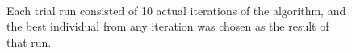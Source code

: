 \documentclass[12pt,fleqn]{article}
\begin{document}
\begin{figure}[h]
  \centering
  \\
  \caption{Each trial run consisted of 10 actual iterations of the algorithm,
           and the best individual from any iteration was chosen as the result 
           of that run.} 
\end{figure}
\end{document}
